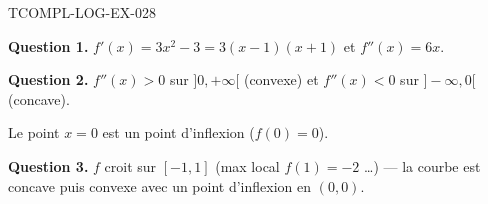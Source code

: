 \begin{corrige}{TCOMPL-LOG-EX-028}

\textbf{Question 1.} $f'(x) = 3x^2 - 3 = 3(x-1)(x+1)$ et $f''(x) = 6x$.


\textbf{Question 2.} $f''(x) > 0$ sur $]0,+\infty[$ (convexe) et $f''(x) < 0$ sur $]-\infty,0[$ (concave).

Le point $x=0$ est un point d'inflexion ($f(0) = 0$).

\textbf{Question 3.} $f$ croit sur $[-1,1]$ (max local $f(1)=-2$ \ldots) — la courbe est concave puis convexe avec un point d'inflexion en $(0,0)$.

\end{corrige}
